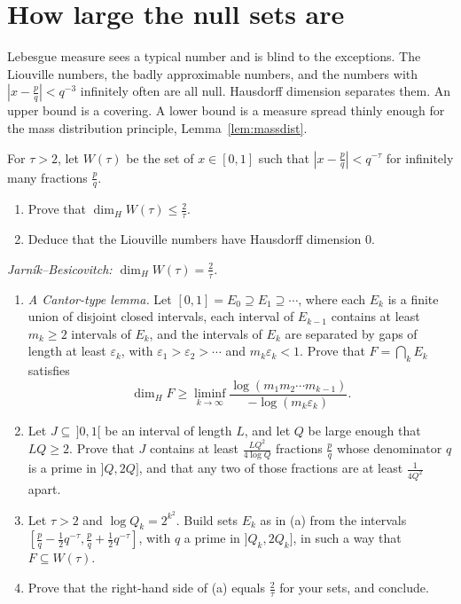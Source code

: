 \section{How large the null sets are}

Lebesgue measure sees a typical number and is blind to the exceptions. The Liouville numbers, the badly approximable numbers, and the numbers with $|x-\frac pq|<q^{-3}$ infinitely often are all null. Hausdorff dimension separates them. An upper bound is a covering. A lower bound is a measure spread thinly enough for the mass distribution principle, Lemma~\ref{lem:massdist}.

\begin{exercise}[$\star$]\label{pb:wtau}
For $\tau>2$, let $W(\tau)$ be the set of $x\in[0,1]$ such that $|x-\frac pq|<q^{-\tau}$ for infinitely many fractions $\frac pq$.
\begin{enumerate}[label=(\alph*)]
\item Prove that $\dim_HW(\tau)\le\frac2\tau$.
\item Deduce that the Liouville numbers have Hausdorff dimension $0$.
\end{enumerate}
\end{exercise}

\begin{exercise}[$\star\star\star$]\label{pb:jarnik}
\emph{Jarník--Besicovitch: $\dim_HW(\tau)=\frac2\tau$.}
\begin{enumerate}[label=(\alph*)]
\item \emph{A Cantor-type lemma.} Let $[0,1]=E_0\supseteq E_1\supseteq\cdots$, where each $E_k$ is a finite union of disjoint closed intervals, each interval of $E_{k-1}$ contains at least $m_k\ge2$ intervals of $E_k$, and the intervals of $E_k$ are separated by gaps of length at least $\varepsilon_k$, with $\varepsilon_1>\varepsilon_2>\cdots$ and $m_k\varepsilon_k<1$. Prove that $F=\bigcap_kE_k$ satisfies
\[
\dim_HF\ge\liminf_{k\to\infty}\frac{\log(m_1m_2\cdots m_{k-1})}{-\log(m_k\varepsilon_k)}.
\]
\item Let $J\subseteq\,]0,1[$ be an interval of length $L$, and let $Q$ be large enough that $LQ\ge2$. Prove that $J$ contains at least $\frac{LQ^2}{4\log Q}$ fractions $\frac pq$ whose denominator $q$ is a prime in $]Q,2Q]$, and that any two of those fractions are at least $\frac1{4Q^2}$ apart.
\item Let $\tau>2$ and $\log Q_k=2^{k^2}$. Build sets $E_k$ as in (a) from the intervals $[\frac pq-\frac12q^{-\tau},\frac pq+\frac12q^{-\tau}]$, with $q$ a prime in $]Q_k,2Q_k]$, in such a way that $F\subseteq W(\tau)$.
\item Prove that the right-hand side of (a) equals $\frac2\tau$ for your sets, and conclude.
\end{enumerate}
\end{exercise}

